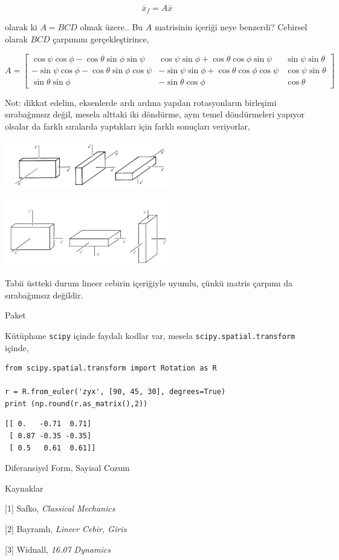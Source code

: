 \documentclass[12pt,fleqn]{article}\usepackage{../../common}
\begin{document}
$$
\bar{x}_f =  A \bar{x}
$$

olarak ki $A = BCD$ olmak üzere.. Bu $A$ matrisinin içeriği neye benzerdi? Cebirsel
olarak $BCD$ çarpımını gerçekleştirince,

$$
A = \left[\begin{array}{ccc}
\cos\psi\cos\phi-\cos\theta\sin\phi\sin\psi &
\cos\psi\sin\phi + \cos\theta\cos\phi\sin\psi &
\sin\psi\sin\theta \\
-\sin\psi\cos\phi-\cos\theta\sin\phi\cos\psi &
-\sin\psi\sin\phi + \cos\theta\cos\phi\cos\psi &
\cos\psi\sin\theta \\
\sin\theta \sin\phi &
-\sin\theta\cos\phi &
\cos\theta
\end{array}\right]
$$

Not: dikkat edelim, eksenlerde ardı ardına yapılan rotasyonların birleşimi
sırabağımsız değil, mesela alttaki iki döndürme, aynı temel döndürmeleri
yapıyor olsalar da farklı sıralarda yaptıkları için farklı sonuçları veriyorlar,

\includegraphics[width=20em]{phy_072_rot_01.png}

\includegraphics[width=20em]{phy_072_rot_02.png}

Tabii üstteki durum lineer cebirin içeriğiyle uyumlu, çünkü matris çarpımı da
sırabağımsız değildir.

Paket

Kütüphane \verb!scipy! içinde faydalı kodlar var, mesela \verb!scipy.spatial.transform!
içinde,

\begin{verbatim}
from scipy.spatial.transform import Rotation as R

r = R.from_euler('zyx', [90, 45, 30], degrees=True)
print (np.round(r.as_matrix(),2))
\end{verbatim}

\begin{verbatim}
[[ 0.   -0.71  0.71]
 [ 0.87 -0.35 -0.35]
 [ 0.5   0.61  0.61]]
\end{verbatim}

Diferansiyel Form, Sayisal Cozum






Kaynaklar

[1] Safko, {\em Classical Mechanics}

[2] Bayramlı, {\em Lineer Cebir, Giris}

[3] Widnall, {\em 16.07 Dynamics}
\end{document}
